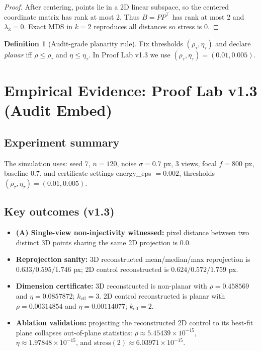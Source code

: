 \documentclass[11pt]{article}
\theoremstyle{definition}
\newtheorem{definition}{Definition}[section]
\theoremstyle{plain}
\theoremstyle{remark}
\newcommand{\Seed}{\ensuremath{7}}
\newcommand{\NPoints}{\ensuremath{120}}
\newcommand{\NoiseSigmaPx}{\ensuremath{0.7}}
\newcommand{\Views}{\ensuremath{3}}
\newcommand{\FocalPx}{\ensuremath{800}}
\newcommand{\Baseline}{\ensuremath{0.7}}
\newcommand{\EnergyEps}{\ensuremath{0.002}}
\newcommand{\RhoTau}{\ensuremath{0.01}}
\newcommand{\EtaTau}{\ensuremath{0.005}}
\newcommand{\SameShadowPixelDist}{\ensuremath{0.0}}
\newcommand{\ReprojThreeDMean}{\ensuremath{0.633}}
\newcommand{\ReprojThreeDMedian}{\ensuremath{0.595}}
\newcommand{\ReprojThreeDMax}{\ensuremath{1.746}}
\newcommand{\ReprojTwoDMean}{\ensuremath{0.624}}
\newcommand{\ReprojTwoDMedian}{\ensuremath{0.572}}
\newcommand{\ReprojTwoDMax}{\ensuremath{1.759}}
\newcommand{\RhoThreeD}{\ensuremath{0.458569}}
\newcommand{\EtaThreeD}{\ensuremath{0.0857872}}
\newcommand{\KEffThreeD}{\ensuremath{3}}
\newcommand{\RhoTwoD}{\ensuremath{0.00314854}}
\newcommand{\EtaTwoD}{\ensuremath{0.00114077}}
\newcommand{\KEffTwoD}{\ensuremath{2}}
\newcommand{\RhoTwoDProj}{\ensuremath{5.45439\times 10^{-15}}}
\newcommand{\EtaTwoDProj}{\ensuremath{1.97848\times 10^{-15}}}
\newcommand{\StressTwoDProjKTwo}{\ensuremath{6.03971\times 10^{-15}}}
\begin{document}
\begin{proof}
After centering, points lie in a 2D linear subspace, so the centered coordinate matrix has rank at most 2.
Thus $B=PP^\top$ has rank at most 2 and $\lambda_3=0$. Exact MDS in $k=2$ reproduces all distances so stress is 0.
\end{proof}

\begin{definition}[Audit-grade planarity rule]
Fix thresholds $(\rho_\tau,\eta_\tau)$ and declare \emph{planar} iff $\rho\le \rho_\tau$ and $\eta\le \eta_\tau$.
In Proof Lab v1.3 we use $(\rho_\tau,\eta_\tau)=(\RhoTau,\EtaTau)$.
\end{definition}

\section{Empirical Evidence: Proof Lab v1.3 (Audit Embed)}

\subsection{Experiment summary}
The simulation uses: seed $\Seed$, $n=\NPoints$, noise $\sigma=\NoiseSigmaPx$ px, $\Views$ views, focal $f=\FocalPx$ px, baseline $\Baseline$,
and certificate settings energy\_eps $=\EnergyEps$, thresholds $(\rho_\tau,\eta_\tau)=(\RhoTau,\EtaTau)$.

\subsection{Key outcomes (v1.3)}
\begin{itemize}
\item \textbf{(A) Single-view non-injectivity witnessed:} pixel distance between two distinct 3D points sharing the same 2D projection is $\SameShadowPixelDist$.
\item \textbf{Reprojection sanity:} 3D reconstructed mean/median/max reprojection is $\ReprojThreeDMean/\ReprojThreeDMedian/\ReprojThreeDMax$ px;
2D control reconstructed is $\ReprojTwoDMean/\ReprojTwoDMedian/\ReprojTwoDMax$ px.
\item \textbf{Dimension certificate:} 3D reconstructed is non-planar with $\rho=\RhoThreeD$ and $\eta=\EtaThreeD$; $k_{\mathrm{eff}}=\KEffThreeD$.
2D control reconstructed is planar with $\rho=\RhoTwoD$ and $\eta=\EtaTwoD$; $k_{\mathrm{eff}}=\KEffTwoD$.
\item \textbf{Ablation validation:} projecting the reconstructed 2D control to its best-fit plane collapses out-of-plane statistics:
$\rho\approx \RhoTwoDProj$, $\eta\approx \EtaTwoDProj$, and $\mathrm{stress}(2)\approx \StressTwoDProjKTwo$.
\end{itemize}
\end{document}

